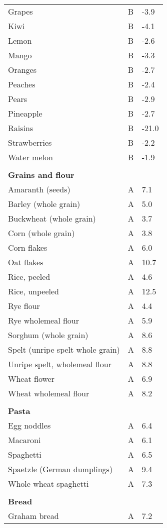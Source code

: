 \documentclass[../main.tex]{subfiles}
\begin{document}
\begin{longtable}{p{7cm}p{0.5cm}p{1cm}}
Grapes  & B  & -3.9 \\
Kiwi  & B  & -4.1 \\
Lemon  & B  & -2.6 \\
Mango  & B  & -3.3 \\
Oranges  & B  & -2.7 \\
Peaches  & B  & -2.4 \\
Pears  & B  & -2.9 \\
Pineapple  & B  & -2.7 \\
Raisins  & B  & -21.0 \\
Strawberries  & B  & -2.2 \\
Water melon  & B  & -1.9 \\
 \\
\multicolumn{3}{l}{\textbf{Grains and flour}}  \\
Amaranth (seeds)  & A  & 7.1 \\
Barley (whole grain)  & A  & 5.0 \\
Buckwheat (whole grain)  & A  & 3.7 \\
Corn (whole grain)  & A  & 3.8 \\
Corn flakes  & A  & 6.0 \\
Oat flakes  & A  & 10.7 \\
Rice, peeled  & A  & 4.6 \\
Rice, unpeeled  & A  & 12.5 \\
Rye flour  & A  & 4.4 \\
Rye wholemeal flour  & A  & 5.9 \\
Sorghum (whole grain)  & A  & 8.6 \\
Spelt (unripe spelt whole grain)  & A  & 8.8 \\
Unripe spelt, wholemeal flour  & A  & 8.8 \\
Wheat flower  & A  & 6.9 \\
Wheat wholemeal flour  & A  & 8.2 \\
 \\
\multicolumn{3}{l}{\textbf{Pasta}}  \\
Egg noddles   & A  & 6.4 \\
Macaroni  & A  & 6.1 \\
Spaghetti  & A  & 6.5 \\
Spaetzle (German dumplings)  & A  & 9.4 \\
Whole wheat spaghetti  & A  & 7.3 \\
 \\
\multicolumn{3}{l}{\textbf{Bread}} \\
Graham bread  & A  & 7.2 \\

\end{longtable}
\end{document}
